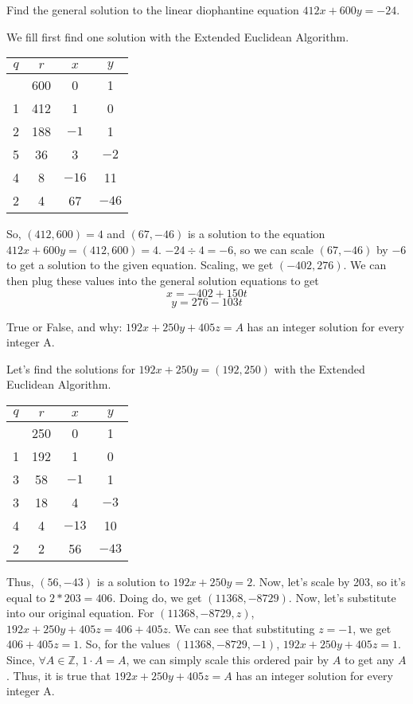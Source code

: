 \documentclass{article}
\begin{document}
\Large
\begin{problem}{}{}
    Find the general solution to the linear diophantine equation $412x+600y=-24$.
\end{problem}
\begin{solution}{}{}
    We fill first find one solution with the Extended Euclidean Algorithm.
    \begin{center}
        \begin{tabular}{c c c c}
            $q$ & $r$ & $x$ & $y$ \\
            \hline
            & 600 & 0 & 1 \\
            1 & 412 & 1 & 0 \\
            2 & 188 & $-1$ & 1 \\
            5 & 36 & 3 & $-2$ \\
            4 & 8 & $-16$ & 11 \\
            2 & 4 & 67 & $-46$
        \end{tabular}
    \end{center}
    So, $(412,600)=4$ and $(67,-46)$ is a solution to the equation $412x+600y=(412,600)=4$. $-24 \div 4=-6$, so we can scale $(67,-46)$ by $-6$ to get a solution to the given equation. Scaling, we get $(-402,276)$. We can then plug these values into the general solution equations to get
    \[x=-402+150t\]
    \[y=276-103t\]
\end{solution}

\begin{problem}{}{}
    True or False, and why: $192x + 250y + 405z = A$ has an integer solution for every integer A.
\end{problem}
\begin{solution}{}{}
    Let's find the solutions for $192x+250y=(192,250)$ with the Extended Euclidean Algorithm.
    \begin{center}
        \begin{tabular}{c c c c}
            $q$ & $r$ & $x$ & $y$ \\
            \hline
            & 250 & 0 & 1 \\
            1 & 192 & 1 & 0 \\
            3 & 58 & $-1$ & 1 \\
            3 & 18 & 4 & $-3$ \\
            4 & 4 & $-13$ & 10 \\
            2 & 2 & 56 & $-43$
        \end{tabular}
    \end{center}
    Thus, $(56,-43)$ is a solution to $192x+250y=2$. Now, let's scale by 203, so it's equal to $2*203=406$. Doing do, we get $(11368,-8729)$. Now, let's substitute into our original equation. For $(11368,-8729,z)$, $192x+250y+405z=406+405z$. We can see that substituting $z=-1$, we get $406+405z=1$. So, for the values $(11368,-8729,-1)$, $192x+250y+405z=1$. Since, $\forall{A}\in\mathbb{Z}$, $1\cdot A=A$, we can simply scale this ordered pair by $A$ to get any $A$. Thus, it is true that $192x + 250y + 405z = A$ has an integer solution for every integer A.
\end{solution}
\end{document}
